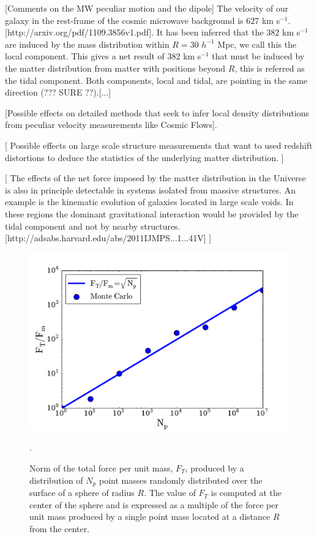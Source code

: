 \documentclass{article}
\begin{document}
[Comments on the MW peculiar motion and the dipole]
The velocity of our galaxy in the rest-frame of the cosmic
microwave background is 627 km
s$^{-1}$. [http://arxiv.org/pdf/1109.3856v1.pdf]. It has been inferred
that the $382$ km s$^{-1}$ are induced by the mass distribution within
$R=30$ $h^{-1}$ Mpc, we call this the local component. This gives a
net result of 382 km s$^{-1}$ that must be induced by the matter
distribution from matter with positions beyond $R$, this is referred
as the tidal component.  Both components, local and tidal, are
pointing in the same direction (??? SURE ??).[...]

[Possible effects on detailed methods that seek to infer local
density distributions from peculiar velocity measurements like Cosmic
  Flows].

[ Possible effects on large scale structure measurements that want
to used redshift distortions to deduce the statistics of the
underlying matter distribution. ]

[ The effects of the net force imposed by the matter distribution
in the Universe is also in principle detectable in systems isolated 
from massive structures. An example is the kinematic evolution of
galaxies located in large scale voids. In these regions the dominant
gravitational interaction would be provided by the tidal component and
not by nearby structures. [http://adsabs.harvard.edu/abs/2011IJMPS...1...41V] ]











\begin{figure}
\begin{center}
\includegraphics[width=0.80\linewidth,angle=0]{spheres_surface.pdf}
\caption{Norm of the total force per unit mass, $F_{T}$, produced by a
  distribution of $N_p$ point masses randomly distributed over the
  surface of a sphere of radius $R$. The value
  of $F_T$ is  computed at the center of the sphere and is  expressed
  as a multiple  of the force per unit mass produced by a  single
  point mass located  at a distance $R$ from the
  center. \label{fig:sphere_surface}}. 
\end{center}
\end{figure}
\end{document}
